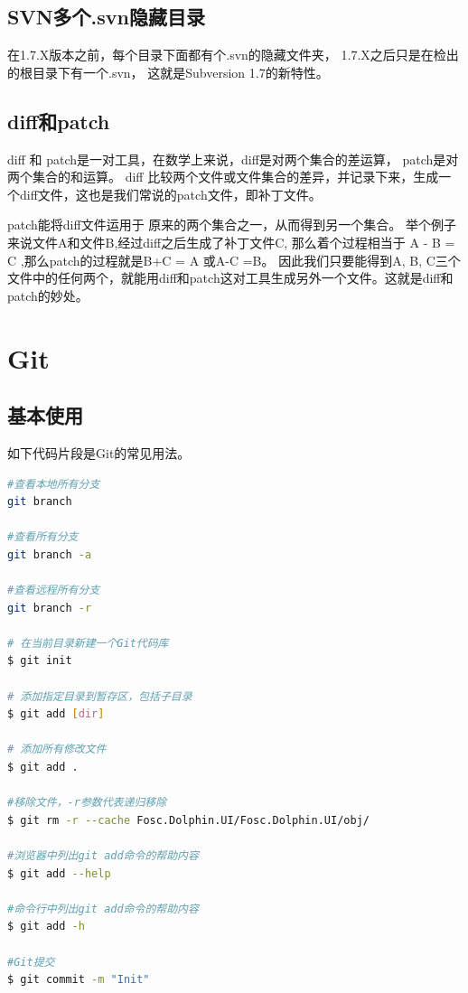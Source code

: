 \documentclass{book}
\begin{document}
\subsection{SVN多个.svn隐藏目录}

在1.7.X版本之前，每个目录下面都有个.svn的隐藏文件夹，
1.7.X之后只是在检出的根目录下有一个.svn，
这就是Subversion 1.7的新特性。

\subsection{diff和patch}

diff 和 patch是一对工具，在数学上来说，diff是对两个集合的差运算，
patch是对两个集合的和运算。 diff 比较两个文件或文件集合的差异，并记录下来，生成一个diff文件，这也是我们常说的patch文件，即补丁文件。 

patch能将diff文件运用于 原来的两个集合之一，从而得到另一个集合。
举个例子来说文件A和文件B,经过diff之后生成了补丁文件C, 那么着个过程相当于 A - B = C ,那么patch的过程就是B+C = A 或A-C =B。 
因此我们只要能得到A, B, C三个文件中的任何两个，就能用diff和patch这对工具生成另外一个文件。这就是diff和patch的妙处。

\section{Git}

\subsection{基本使用}

如下代码片段是Git的常见用法。

\begin{lstlisting}[language=Bash]
#查看本地所有分支
git branch

#查看所有分支
git branch -a

#查看远程所有分支
git branch -r

# 在当前目录新建一个Git代码库
$ git init

# 添加指定目录到暂存区，包括子目录
$ git add [dir]

# 添加所有修改文件
$ git add .

#移除文件，-r参数代表递归移除
$ git rm -r --cache Fosc.Dolphin.UI/Fosc.Dolphin.UI/obj/

#浏览器中列出git add命令的帮助内容
$ git add --help

#命令行中列出git add命令的帮助内容
$ git add -h

#Git提交
$ git commit -m "Init"
\end{lstlisting}
\end{document}
